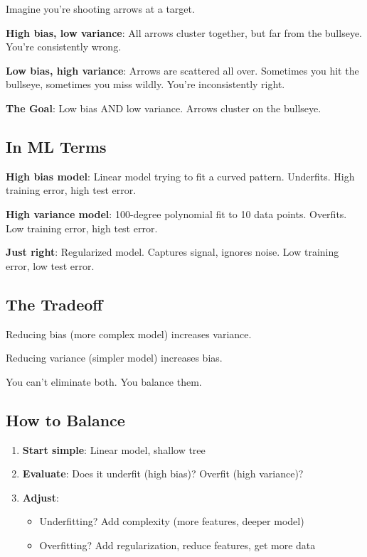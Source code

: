 Imagine you're shooting arrows at a target.

\textbf{High bias, low variance}: All arrows cluster together, but far from the bullseye. You're consistently wrong.

\textbf{Low bias, high variance}: Arrows are scattered all over. Sometimes you hit the bullseye, sometimes you miss wildly. You're inconsistently right.

\textbf{The Goal}: Low bias AND low variance. Arrows cluster on the bullseye.

\subsection{In ML Terms}

\textbf{High bias model}: Linear model trying to fit a curved pattern. Underfits. High training error, high test error.

\textbf{High variance model}: 100-degree polynomial fit to 10 data points. Overfits. Low training error, high test error.

\textbf{Just right}: Regularized model. Captures signal, ignores noise. Low training error, low test error.

\subsection{The Tradeoff}

Reducing bias (more complex model) increases variance.

Reducing variance (simpler model) increases bias.

You can't eliminate both. You balance them.

\subsection{How to Balance}

\begin{enumerate}
    \item \textbf{Start simple}: Linear model, shallow tree
    \item \textbf{Evaluate}: Does it underfit (high bias)? Overfit (high variance)?
    \item \textbf{Adjust}:
    \begin{itemize}
        \item Underfitting? Add complexity (more features, deeper model)
        \item Overfitting? Add regularization, reduce features, get more data
    \end{itemize}
\end{enumerate}


